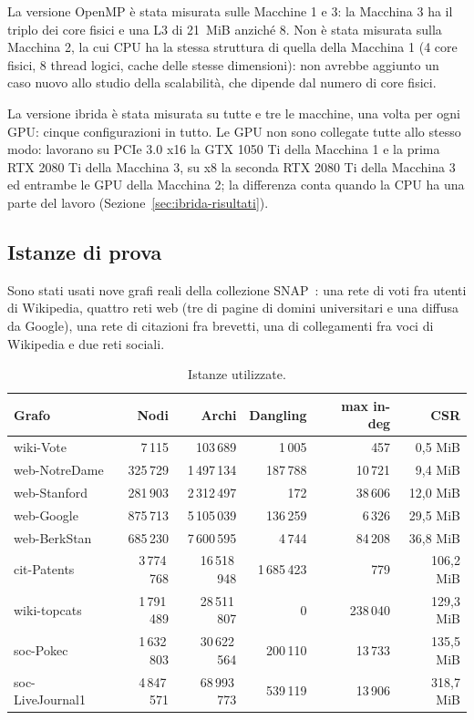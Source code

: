\documentclass[11pt,a4paper]{article}
\newcommand{\stacco}{\par\medskip\noindent}
\begin{document}
\stacco
La versione OpenMP è stata misurata sulle Macchine 1 e 3: la Macchina 3 ha
il triplo dei core fisici e una L3 di 21~MiB anziché 8. Non è stata misurata
sulla Macchina 2, la cui CPU ha la stessa struttura di quella della Macchina 1
(4 core fisici, 8 thread logici, cache delle stesse dimensioni): non avrebbe
aggiunto un caso nuovo allo studio della scalabilità, che dipende dal numero
di core fisici.

\stacco
La versione ibrida è stata misurata su tutte e tre le macchine, una
volta per ogni GPU: cinque configurazioni in tutto. Le GPU non sono
collegate tutte allo stesso modo: lavorano su PCIe 3.0 x16 la GTX 1050 Ti della
Macchina 1 e la prima RTX 2080 Ti della Macchina 3, su x8 la seconda RTX 2080
Ti della Macchina 3 ed entrambe le GPU della Macchina 2; la differenza conta
quando la CPU ha una parte del lavoro (Sezione~\ref{sec:ibrida-risultati}).

\subsection{Istanze di prova}
Sono stati usati nove grafi reali della collezione
SNAP~\cite{snap}: una rete di voti fra utenti di Wikipedia, quattro reti
web (tre di pagine di domini universitari e una diffusa da Google), una rete
di citazioni fra brevetti, una di collegamenti fra voci di Wikipedia e due
reti sociali.

\begin{table}[h]
\centering
\caption{Istanze utilizzate.}
\label{tab:dataset}
\begin{tabular}{@{}lrrrrr@{}}
\toprule
\textbf{Grafo} & \textbf{Nodi} & \textbf{Archi} & \textbf{Dangling} &
\textbf{max in-deg} & \textbf{CSR} \\
\midrule
wiki-Vote        & 7\,115      & 103\,689       & 1\,005      & 457       & 0,5 MiB \\
web-NotreDame    & 325\,729    & 1\,497\,134    & 187\,788    & 10\,721   & 9,4 MiB \\
web-Stanford     & 281\,903    & 2\,312\,497    & 172         & 38\,606   & 12,0 MiB \\
web-Google       & 875\,713    & 5\,105\,039    & 136\,259    & 6\,326    & 29,5 MiB \\
web-BerkStan     & 685\,230    & 7\,600\,595    & 4\,744      & 84\,208   & 36,8 MiB \\
cit-Patents      & 3\,774\,768 & 16\,518\,948   & 1\,685\,423 & 779       & 106,2 MiB \\
wiki-topcats     & 1\,791\,489 & 28\,511\,807   & 0           & 238\,040  & 129,3 MiB \\
soc-Pokec        & 1\,632\,803 & 30\,622\,564   & 200\,110    & 13\,733   & 135,5 MiB \\
soc-LiveJournal1 & 4\,847\,571 & 68\,993\,773   & 539\,119    & 13\,906   & 318,7 MiB \\
\bottomrule
\end{tabular}
\end{table}
\end{document}
